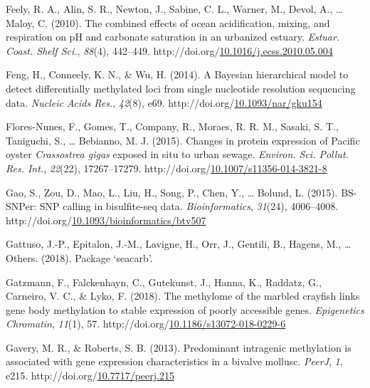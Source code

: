 \documentclass [11pt, proquest] {uwthesis}[2015/03/03]
\newlength{\cslhangindent}
\newenvironment{CSLReferences}%
{\setlength{\parindent}{0pt}%
\everypar{\setlength{\hangindent}{\cslhangindent}}\ignorespaces}%
{\par}
\begin{document}
\begin{CSLReferences}{1}{0}
\leavevmode\hypertarget{ref-Feely2010}{}%
Feely, R. A., Alin, S. R., Newton, J., Sabine, C. L., Warner, M., Devol, A., \ldots{} Maloy, C. (2010). {The combined effects of ocean acidification, mixing, and respiration on pH and carbonate saturation in an urbanized estuary}. \emph{Estuar. Coast. Shelf Sci.}, \emph{88}(4), 442--449. http://doi.org/\href{https://doi.org/10.1016/j.ecss.2010.05.004}{10.1016/j.ecss.2010.05.004}

\leavevmode\hypertarget{ref-Feng2014}{}%
Feng, H., Conneely, K. N., \& Wu, H. (2014). {A Bayesian hierarchical model to detect differentially methylated loci from single nucleotide resolution sequencing data}. \emph{Nucleic Acids Res.}, \emph{42}(8), e69. http://doi.org/\href{https://doi.org/10.1093/nar/gku154}{10.1093/nar/gku154}

\leavevmode\hypertarget{ref-Flores-Nunes2015}{}%
Flores-Nunes, F., Gomes, T., Company, R., Moraes, R. R. M., Sasaki, S. T., Taniguchi, S., \ldots{} Bebianno, M. J. (2015). {Changes in protein expression of Pacific oyster \emph{Crassostrea gigas} exposed in situ to urban sewage}. \emph{Environ. Sci. Pollut. Res. Int.}, \emph{22}(22), 17267--17279. http://doi.org/\href{https://doi.org/10.1007/s11356-014-3821-8}{10.1007/s11356-014-3821-8}

\leavevmode\hypertarget{ref-Gao2015}{}%
Gao, S., Zou, D., Mao, L., Liu, H., Song, P., Chen, Y., \ldots{} Bolund, L. (2015). {BS-SNPer: SNP calling in bisulfite-seq data}. \emph{Bioinformatics}, \emph{31}(24), 4006--4008. http://doi.org/\href{https://doi.org/10.1093/bioinformatics/btv507}{10.1093/bioinformatics/btv507}

\leavevmode\hypertarget{ref-Gattuso2018}{}%
Gattuso, J.-P., Epitalon, J.-M., Lavigne, H., Orr, J., Gentili, B., Hagens, M., \ldots{} Others. (2018). {Package {`seacarb'}}.

\leavevmode\hypertarget{ref-Gatzmann2018}{}%
Gatzmann, F., Falckenhayn, C., Gutekunst, J., Hanna, K., Raddatz, G., Carneiro, V. C., \& Lyko, F. (2018). {The methylome of the marbled crayfish links gene body methylation to stable expression of poorly accessible genes}. \emph{Epigenetics Chromatin}, \emph{11}(1), 57. http://doi.org/\href{https://doi.org/10.1186/s13072-018-0229-6}{10.1186/s13072-018-0229-6}

\leavevmode\hypertarget{ref-Gavery2013}{}%
Gavery, M. R., \& Roberts, S. B. (2013). {Predominant intragenic methylation is associated with gene expression characteristics in a bivalve mollusc}. \emph{PeerJ}, \emph{1}, e215. http://doi.org/\href{https://doi.org/10.7717/peerj.215}{10.7717/peerj.215}


\end{CSLReferences}
\end{document}
